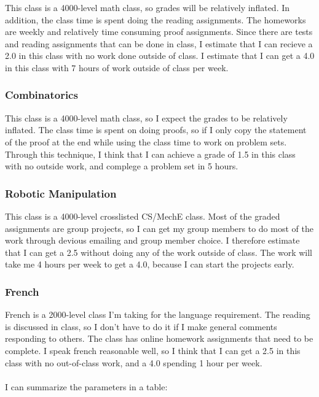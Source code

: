 \documentclass{article}
\begin{document}
This class is a 4000-level math class, so grades will be relatively inflated.
In addition, the class time is spent doing the reading assignments.
The homeworks are weekly and relatively time consuming proof assignments.
Since there are tests and reading assignments that can be done in class,
	I estimate that I can recieve a 2.0 in this class with no work
	done outside of class.
I estimate that I can get a 4.0 in this class with 7 hours of work outside 
	of class per week.

\subsubsection{Combinatorics}

This class is a 4000-level math class, so I expect the grades to be relatively
	inflated.
The class time is spent on doing proofs, so if I only copy the statement of the
	proof at the end while using the class time to work on problem sets.
Through this technique, I think that I can achieve a grade of 1.5 in this class
	with no outside work, and complege a problem set in 5 hours.

\subsubsection{Robotic Manipulation}

This class is a 4000-level crosslisted CS/MechE class.
Most of the graded assignments are group projects, so I can get my group members
	to do most of the work through devious emailing and group member choice.
I therefore estimate that I can get a 2.5 without doing any of the work outside of class.
The work will take me 4 hours per week to get a 4.0, because I can start the 
	projects early.

\subsubsection{French}

French is a 2000-level class I'm taking for the language requirement.
The reading is discussed in class, so I don't have to do it if I make general
	comments responding to others.
The class has online homework assignments that need to be complete.
I speak french reasonable well, so I think that I can get a 2.5 in this class
	with no out-of-class work, and a 4.0 spending 1 hour per week.

\paragraph{}
I can summarize the parameters in a table:
\end{document}

